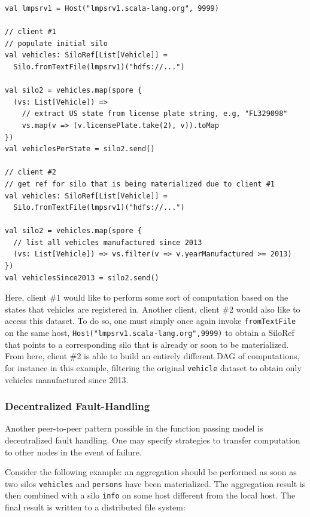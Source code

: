 \documentclass{jfp1}
\begin{document}
\begin{lstlisting}
val lmpsrv1 = Host("lmpsrv1.scala-lang.org", 9999)

// client #1
// populate initial silo
val vehicles: SiloRef[List[Vehicle]] =
  Silo.fromTextFile(lmpsrv1)("hdfs://...")

val silo2 = vehicles.map(spore {
  (vs: List[Vehicle]) =>
    // extract US state from license plate string, e.g, "FL329098"
    vs.map(v => (v.licensePlate.take(2), v)).toMap
})
val vehiclesPerState = silo2.send()

// client #2
// get ref for silo that is being materialized due to client #1
val vehicles: SiloRef[List[Vehicle]] =
  Silo.fromTextFile(lmpsrv1)("hdfs://...")

val silo2 = vehicles.map(spore {
  // list all vehicles manufactured since 2013
  (vs: List[Vehicle]) => vs.filter(v => v.yearManufactured >= 2013)
})
val vehiclesSince2013 = silo2.send()
\end{lstlisting}

Here, client \#1 would like to perform some sort of computation based on the
states that vehicles are registered in. Another client, client \#2 would also
like to access this dataset. To do so, one must simply once again invoke
\verb|fromTextFile| on the same host, \verb|Host("lmpsrv1.scala-lang.org",9999)|
to obtain a SiloRef that points to a corresponding silo that is already or soon
to be materialized. From here, client \#2 is able to build an entirely different
DAG of computations, for instance in this example, filtering the original
\verb|vehicle| dataset to obtain only vehicles manufactured since 2013.

\subsubsection{Decentralized Fault-Handling}

Another peer-to-peer pattern possible in the function passing model is
decentralized fault handling. One may specify strategies to transfer computation
to other nodes in the event of failure.

Consider the following example: an aggregation should be performed as soon as
two silos \verb|vehicles| and \verb|persons| have been materialized. The
aggregation result is then combined with a silo \verb|info| on some host
different from the local host. The final result is written to a distributed file
system:
\end{document}
